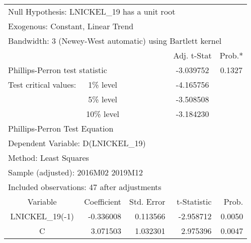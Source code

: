 \begin{tabular}{lrrrr}
\toprule
\multicolumn{4}{l}{Null Hypothesis: LNICKEL\_19 has a unit root}&\multicolumn{1}{c}{}\\
\multicolumn{3}{l}{Exogenous: Constant, Linear Trend}&\multicolumn{1}{c}{}&\multicolumn{1}{c}{}\\
\multicolumn{5}{l}{Bandwidth: 3 (Newey-West automatic) using Bartlett kernel}\\
\midrule
\multicolumn{1}{c}{}&\multicolumn{1}{c}{}&\multicolumn{1}{c}{}&\multicolumn{1}{c}{Adj. t-Stat}&\multicolumn{1}{c}{Prob.*}\\
\midrule
\multicolumn{2}{l}{Phillips-Perron test statistic}&\multicolumn{1}{l}{}&\multicolumn{1}{c}{-3.039752}&\multicolumn{1}{c}{0.1327}\\
\multicolumn{1}{l}{Test critical values:}&\multicolumn{1}{c}{1\% level}&\multicolumn{1}{c}{}&\multicolumn{1}{c}{-4.165756}&\multicolumn{1}{c}{}\\
\multicolumn{1}{c}{}&\multicolumn{1}{c}{5\% level}&\multicolumn{1}{c}{}&\multicolumn{1}{c}{-3.508508}&\multicolumn{1}{c}{}\\
\multicolumn{1}{c}{}&\multicolumn{1}{c}{10\% level}&\multicolumn{1}{c}{}&\multicolumn{1}{c}{-3.184230}&\multicolumn{1}{c}{}\\
\midrule
\multicolumn{2}{l}{Phillips-Perron Test Equation}&\multicolumn{1}{c}{}&\multicolumn{1}{c}{}&\multicolumn{1}{c}{}\\
\multicolumn{3}{l}{Dependent Variable: D(LNICKEL\_19)}&\multicolumn{1}{c}{}&\multicolumn{1}{c}{}\\
\multicolumn{2}{l}{Method: Least Squares}&\multicolumn{1}{c}{}&\multicolumn{1}{c}{}&\multicolumn{1}{c}{}\\
\multicolumn{3}{l}{Sample (adjusted): 2016M02 2019M12}&\multicolumn{1}{c}{}&\multicolumn{1}{c}{}\\
\multicolumn{4}{l}{Included observations: 47 after adjustments}&\multicolumn{1}{c}{}\\
\midrule
\multicolumn{1}{c}{Variable}&\multicolumn{1}{r}{Coefficient}&\multicolumn{1}{r}{Std. Error}&\multicolumn{1}{r}{t-Statistic}&\multicolumn{1}{r}{Prob.}\\
\midrule
\multicolumn{1}{c}{LNICKEL\_19(-1)}&\multicolumn{1}{r}{-0.336008}&\multicolumn{1}{r}{0.113566}&\multicolumn{1}{r}{-2.958712}&\multicolumn{1}{r}{0.0050}\\
\multicolumn{1}{c}{C}&\multicolumn{1}{r}{3.071503}&\multicolumn{1}{r}{1.032301}&\multicolumn{1}{r}{2.975396}&\multicolumn{1}{r}{0.0047}\\

\end{tabular}
